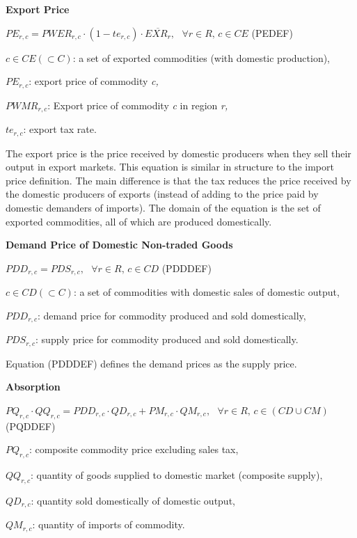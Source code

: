 \documentclass[10pt,a4paper,titlepage,dvipdfmx]{book}
\begin{document}
\begin{flushleft}\textbf{Export Price}\end{flushleft}


\begin{center}$PE_{r,c}=PWER_{r,c}\cdot \left(1-te_{r,c}\right)\cdot \overline{EXR_{r}},\,\,\,\,\forall r\in R,\,c\in CE$ (PEDEF)
\end{center}
\begin{flushleft}
$c\in CE\left(\subset C\right)$: a set of exported commodities (with domestic production),

$PE_{r,c}$: export price of commodity \textit{c,}

$PWMR_{r,c}$: Export price of commodity \textit{c} in region \textit{r,}

$te_{r,c}$: export tax rate.
\end{flushleft}

The export price is the price received by domestic producers when they sell their output in export markets. This equation is similar in structure to the import price definition. The main difference is that the tax reduces the price received by the domestic producers of exports (instead of adding to the price paid by domestic demanders of imports). The domain of the equation is the set of exported commodities, all of which are produced domestically.

\begin{flushleft}\textbf{Demand Price of Domestic Non-traded Goods}\end{flushleft}


\begin{center}$PDD_{r,c}=PDS_{r,c},\,\,\,\,\forall r\in R,\,c\in CD$ (PDDDEF)
\end{center}

\begin{flushleft}
$c\in CD\left(\subset C\right)$: a set of commodities with domestic sales of domestic output,

$PDD_{r,c}$: demand price for commodity produced and sold domestically,

$PDS_{r,c}$: supply price for commodity produced and sold domestically. 
\end{flushleft}

Equation (PDDDEF) defines the demand prices as the supply price.

\begin{flushleft}\textbf{Absorption}\end{flushleft}


\begin{center}$PQ_{r,c}\cdot QQ_{r,c}=PDD_{r,c}\cdot QD_{r,c}+PM_{r,c}\cdot QM_{r,c},\,\,\,\,\forall r\in R,\,c\in \left(CD\cup CM\right)$ (PQDDEF)
\end{center}
\begin{flushleft}
$PQ_{r,c}$: composite commodity price excluding sales tax,

$QQ_{r,c}$: quantity of goods supplied to domestic market (composite supply),

$QD_{r,c}$: quantity sold domestically of domestic output,

$QM_{r,c}$: quantity of imports of commodity.
\end{flushleft}
\end{document}

